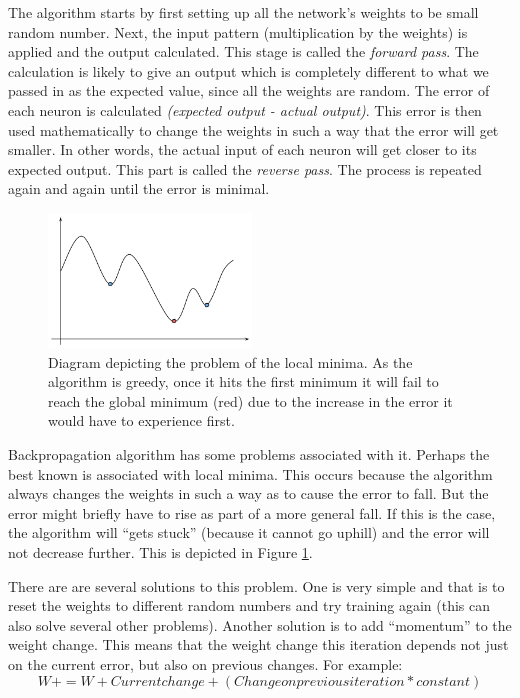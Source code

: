 The algorithm starts by first setting up all the network's weights to be small random number. Next, the input pattern (multiplication by the weights) is applied and the output calculated. This stage is called the \textit{forward pass}. The calculation is likely to give an output which is completely different to what we passed in as the expected value, since all the weights are random. The error of each neuron is calculated \textit{(expected output - actual output)}. This error is then used mathematically to change the weights in such a way that the error will get smaller. In other words, the actual input of each neuron will get closer to its expected output. This  part is called the \textit{reverse pass}. The process is repeated again and again until the error is minimal.

\begin{figure}
  \vspace{-30pt}
  \begin{center}
    \includegraphics[width=0.48\textwidth]{Figures/localminima}
  \end{center}
  \caption{Diagram depicting the problem of the local minima. As the algorithm is greedy, once it hits the first minimum it will fail to reach the global minimum (red) due to the increase in the error it would have to experience first.}
  \label{fig:localminima}
\end{figure}

Backpropagation algorithm has some problems associated with it. Perhaps the best known is associated with local minima. This occurs because the algorithm always changes the weights in such a way as to cause the error to fall. But the error might briefly have to rise as part of a more general fall. If this is the case, the algorithm will ``gets stuck'' (because it cannot go uphill) and the error will not decrease further. This is depicted in Figure \ref{fig:localminima}.

There are are several solutions to this problem. One is very simple and that is to reset the weights to different random numbers and try training again (this can also solve several other problems). Another solution is to add ``momentum'' to the weight change. This means that the weight change this iteration depends not just on the current error, but also on previous changes. For example: 
\begin{equation}
W+ = W + Current change + (Change on previous iteration * constant)
\end{equation}

